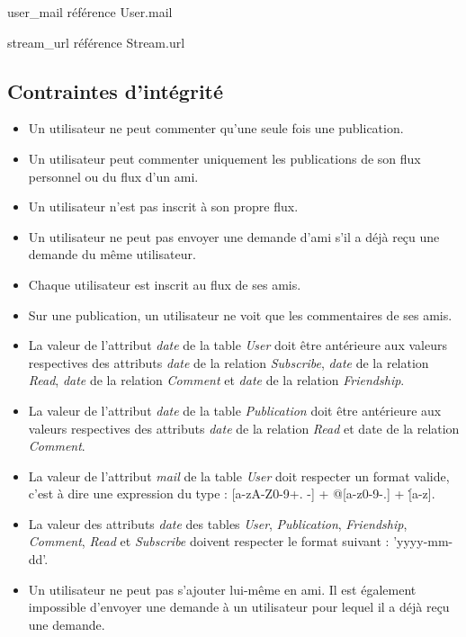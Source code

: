 \documentclass[a4paper,10pt]{article}
\begin{document}
user\_mail référence User.mail

stream\_url référence Stream.url
\\

\subsection{Contraintes d’intégrité}

	\begin{itemize}
	    \item Un utilisateur ne peut commenter qu'une seule fois une publication.
	    \item Un utilisateur peut commenter uniquement les publications de son flux personnel ou du flux d'un ami.
	    \item Un utilisateur n'est pas inscrit à son propre flux.
	    \item Un utilisateur ne peut pas envoyer une demande d'ami s'il a déjà reçu une demande du même utilisateur.
	    \item Chaque utilisateur est inscrit au flux de ses amis.
	    \item Sur une publication, un utilisateur ne voit que les commentaires de ses amis.
	    \item La valeur de l'attribut \textsl{date} de la table \textsl{User} doit être antérieure aux valeurs respectives des attributs \textsl{date} de la relation \textsl{Subscribe}, \textsl{date} de la relation \textsl{Read}, \textsl{date} de la relation \textsl{Comment} et \textsl{date} de la relation \textsl{Friendship}.
	    \item La valeur de l'attribut \textsl{date} de la table \textsl{Publication} doit être antérieure aux valeurs respectives des attributs \textsl{date} de la relation \textsl{Read} et date de la relation \textsl{Comment}.
	    \item La valeur de l'attribut \textsl{mail} de la table \textsl{User} doit respecter un format valide, c'est à dire une expression du type : [a-zA-Z0-9+. -] + @[a-z0-9-.] + \.[a-z].
	    \item La valeur des attributs \textsl{date} des tables \textsl{User}, \textsl{Publication}, \textsl{Friendship}, \textsl{Comment}, \textsl{Read} et \textsl{Subscribe} doivent respecter le format suivant : 'yyyy-mm-dd'.
	    \item Un utilisateur ne peut pas s'ajouter lui-même en ami. Il est également impossible d'envoyer une demande à un utilisateur pour lequel il a déjà reçu une demande.
	\end{itemize}
\end{document}
